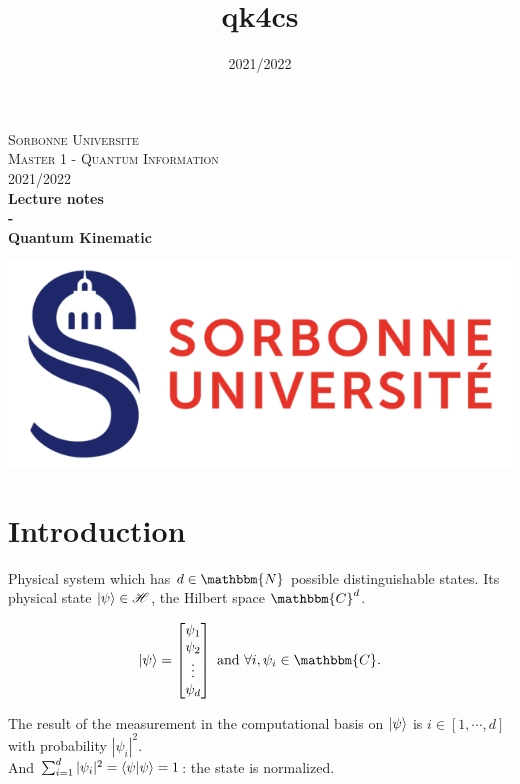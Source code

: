 \documentclass{article}
\title{qk4cs}
\author{}
\date{2021/2022}
\begin{document}
\begin{titlepage}
\begin{center}

\textsc{\LARGE Sorbonne Universite} \\[1cm]
\textsc{\LARGE Master 1 - Quantum Information} \\[1cm]
\textsc{\Large 2021/2022} \\[7cm]


{\huge \bfseries Lecture notes} \\[0.5cm]
{\huge \bfseries -} \\[0.5cm]
{\huge \bfseries Quantum Kinematic} \\[4cm]
\vfill

\includegraphics[scale=0.8]{su.png}

\end{center}
\end{titlepage}

\tableofcontents

\newpage

\section{Introduction}
Physical system which has $d \in \mathbbm{N}$ possible distinguishable states.
Its physical state $\ket{\psi} \in \mathscr{H}$, the Hilbert space
$\mathbbm{C}^d$.

\begin{equation}
    \ket{\psi} = \begin{bmatrix} \psi_1\\ \psi_2 \\ \vdots \\ \psi_d\end{bmatrix}
    \text{ and } \forall i, \psi_i \in \mathbbm{C}.
\end{equation}


\noindent
The result of the measurement in the computational basis on $\ket{\psi}$ is $i
\in [1, \cdots, d]$ with probability $|\psi_i|^2$. \\ \noindent And
$\sum_{i=1}^d |\psi_i|^2 = \braket{\psi|\psi} = 1$: the state is normalized.
\end{document}
